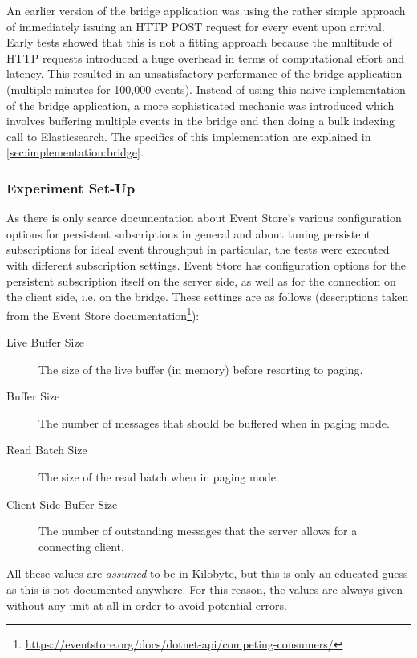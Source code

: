 An earlier version of the bridge application was using the rather simple approach of immediately issuing an \ac{HTTP} POST request for every event upon arrival.
Early tests showed that this is not a fitting approach because the multitude of HTTP requests introduced a huge overhead in terms of computational effort and latency.
This resulted in an unsatisfactory performance of the bridge application (multiple minutes for 100,000 events).
Instead of using this naive implementation of the bridge application, a more sophisticated mechanic was introduced which involves buffering multiple events in the bridge and then doing a bulk indexing call to Elasticsearch.
The specifics of this implementation are explained in \cref{sec:implementation:bridge}.

\subsubsection{Experiment Set-Up}

As there is only scarce documentation about Event Store's various configuration options for persistent subscriptions in general and about tuning persistent subscriptions for ideal event throughput in particular, the tests were executed with different subscription settings.
Event Store has configuration options for the persistent subscription itself on the server side, as well as for the connection on the client side, i.e. on the bridge.
These settings are as follows (descriptions taken from the Event Store documentation\footnote{\url{https://eventstore.org/docs/dotnet-api/competing-consumers/}}):

\begin{description}
\item[Live Buffer Size] The size of the live buffer (in memory) before resorting to paging.
\item[Buffer Size] The number of messages that should be buffered when in paging mode.
\item[Read Batch Size] The size of the read batch when in paging mode.
\item[Client-Side Buffer Size] The number of outstanding messages that the server allows for a connecting client.
\end{description}

All these values are \emph{assumed} to be in Kilobyte, but this is only an educated guess as this is not documented anywhere.
For this reason, the values are always given without any unit at all in order to avoid potential errors.

